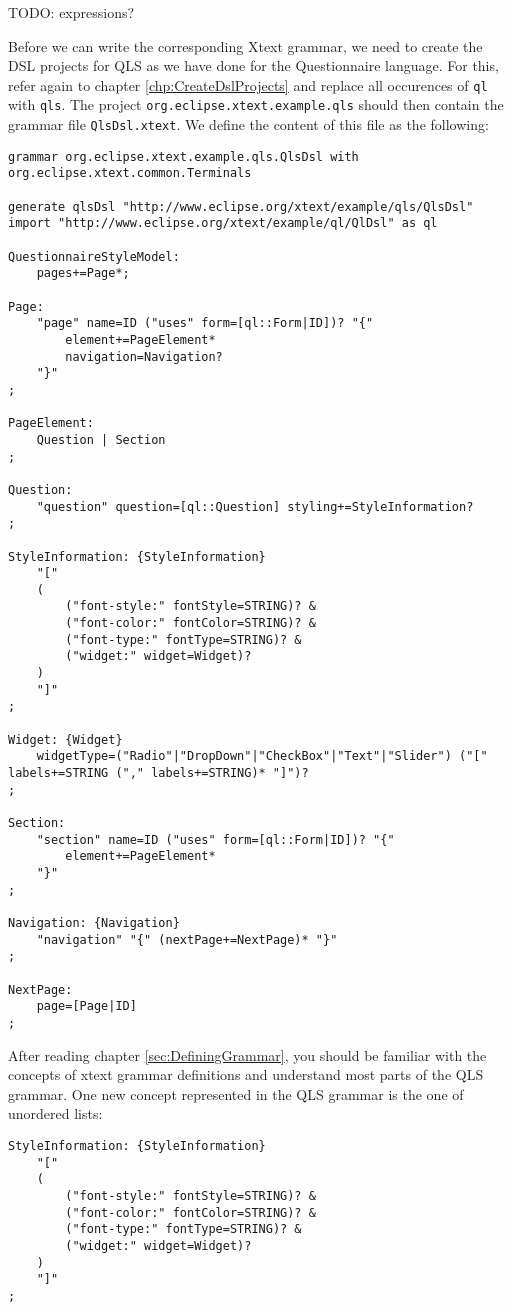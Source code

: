 TODO: expressions? 

Before we can write the corresponding Xtext grammar, we need to create the DSL 
projects for QLS as we have done for the Questionnaire language. For this, refer
again to chapter \ref{chp:CreateDslProjects} and replace all occurences of 
\texttt{ql} with \texttt{qls}. The project \texttt{org.eclipse.xtext.example.qls}
should then contain the grammar file \texttt{QlsDsl.xtext}. We define the content
of this file as the following:

\begin{lstlisting}[language=Xtext]
grammar org.eclipse.xtext.example.qls.QlsDsl with org.eclipse.xtext.common.Terminals

generate qlsDsl "http://www.eclipse.org/xtext/example/qls/QlsDsl"
import "http://www.eclipse.org/xtext/example/ql/QlDsl" as ql

QuestionnaireStyleModel:
	pages+=Page*;
	
Page:
	"page" name=ID ("uses" form=[ql::Form|ID])? "{"
		element+=PageElement*
		navigation=Navigation?
	"}"
;

PageElement:
	Question | Section
;

Question:
	"question" question=[ql::Question] styling+=StyleInformation?	
;

StyleInformation: {StyleInformation}
	"["
	(
		("font-style:" fontStyle=STRING)? &
		("font-color:" fontColor=STRING)? &
		("font-type:" fontType=STRING)? &
		("widget:" widget=Widget)?
	)
	"]"
;

Widget: {Widget}
	widgetType=("Radio"|"DropDown"|"CheckBox"|"Text"|"Slider") ("[" labels+=STRING ("," labels+=STRING)* "]")?
;
  
Section:
	"section" name=ID ("uses" form=[ql::Form|ID])? "{"
		element+=PageElement*
	"}"
;

Navigation: {Navigation}
	"navigation" "{" (nextPage+=NextPage)* "}"
;

NextPage:
	page=[Page|ID]
;
\end{lstlisting}

After reading chapter \ref{sec:DefiningGrammar}, you should be familiar with the
concepts of xtext grammar definitions and understand most parts of the QLS grammar.
One new concept represented in the QLS grammar is the one of unordered lists:

\begin{lstlisting}[language=Xtext]
StyleInformation: {StyleInformation}
	"["
	(
		("font-style:" fontStyle=STRING)? &
		("font-color:" fontColor=STRING)? &
		("font-type:" fontType=STRING)? &
		("widget:" widget=Widget)?
	)
	"]"
;
\end{lstlisting}

